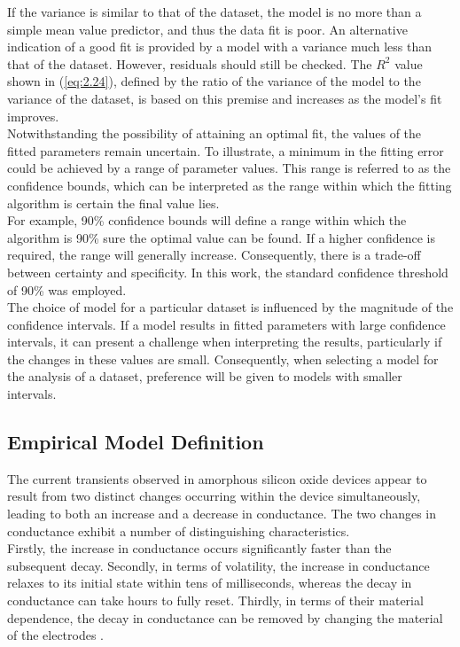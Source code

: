 \noindent If the variance is similar to that of the dataset, the model is no more than a simple mean value predictor, and thus the data fit is poor. An alternative indication of a good fit is provided by a model with a variance much less than that of the dataset. However, residuals should still be checked. The $R^2$ value shown in (\ref{eq:2.24}), defined by the ratio of the variance of the model to the variance of the dataset, is based on this premise and increases as the model's fit improves.\\

\noindent Notwithstanding the possibility of attaining an optimal fit, the values of the fitted parameters remain uncertain. To illustrate, a minimum in the fitting error could be achieved by a range of parameter values. This range is referred to as the confidence bounds, which can be interpreted as the range within which the fitting algorithm is certain the final value lies. \\

\noindent For example, 90\% confidence bounds will define a range within which the algorithm is 90\% sure the optimal value can be found. If a higher confidence is required, the range will generally increase. Consequently, there is a trade-off between certainty and specificity. In this work, the standard confidence threshold of 90\% was employed.\\

\noindent The choice of model for a particular dataset is influenced by the magnitude of the confidence intervals. If a model results in fitted parameters with large confidence intervals, it can present a challenge when interpreting the results, particularly if the changes in these values are small. Consequently, when selecting a model for the analysis of a dataset, preference will be given to models with smaller intervals.

\subsection[Empirical Model Definition]{Empirical Model Definition}

The current transients observed in amorphous silicon oxide devices appear to result from two distinct changes occurring within the device simultaneously, leading to both an increase and a decrease in conductance. The two changes in conductance exhibit a number of distinguishing characteristics. \\

\noindent Firstly, the increase in conductance occurs significantly faster than the subsequent decay. Secondly, in terms of volatility, the increase in conductance relaxes to its initial state within tens of milliseconds, whereas the decay in conductance can take hours to fully reset. Thirdly, in terms of their material dependence, the decay in conductance can be removed by changing the material of the electrodes \cite{mannion2022current}. \\

